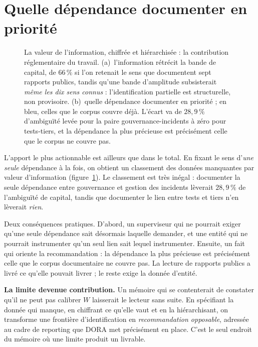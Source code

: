 

\section{Quelle dépendance documenter en priorité}

\begin{figure}[htbp]
  \centering
  \caption{La valeur de l'information, chiffrée et hiérarchisée : la
contribution réglementaire du travail. (a)~l'information rétrécit la bande de capital, de
$66\,\%$ si l'on retenait le sens que documentent sept rapports publics, tandis qu'une bande
d'amplitude subsisterait \emph{même les dix sens connus} : l'identification partielle est
structurelle, non provisoire. (b)~quelle dépendance documenter en priorité ; en bleu,
celles que le corpus couvre déjà. L'écart va de $28{,}9\,\%$ d'ambiguïté levée
pour la paire gouvernance-incidents à zéro pour tests-tiers, et la dépendance la plus précieuse
est précisément celle que le corpus ne couvre pas.}
  \label{fig:voi}
\end{figure}

L'apport le plus actionnable est ailleurs que dans le total. En fixant le sens d'\emph{une seule}
dépendance à la fois, on obtient un classement des données manquantes par valeur
d'information (figure~\ref{fig:voi}). Le classement est très inégal : documenter la seule dépendance
entre gouvernance et gestion des incidents lèverait $28{,}9\,\%$ de
l'ambiguïté de capital, tandis que documenter le lien entre tests et tiers n'en lèverait
\emph{rien}.

Deux conséquences pratiques. D'abord, un superviseur qui ne pourrait exiger qu'une seule
dépendance sait désormais laquelle demander, et une entité qui ne pourrait instrumenter qu'un seul
lien sait lequel instrumenter. Ensuite, un fait qui oriente la recommandation : la
dépendance la plus précieuse est précisément celle que le corpus documentaire ne couvre pas. La
lecture de rapports publics a livré ce qu'elle pouvait livrer ; le reste exige la donnée d'entité.


\begin{cle}
\textbf{La limite devenue contribution.} Un mémoire qui se contenterait de constater qu'il ne
peut pas calibrer $W$ laisserait le lecteur sans suite. En spécifiant la donnée qui manque, en
chiffrant ce qu'elle vaut et en la hiérarchisant, on transforme une frontière d'identification en
\emph{recommandation opposable}, adressée au cadre de reporting que DORA met précisément en
place. C'est le seul endroit du mémoire où une limite produit un livrable.
\end{cle}

